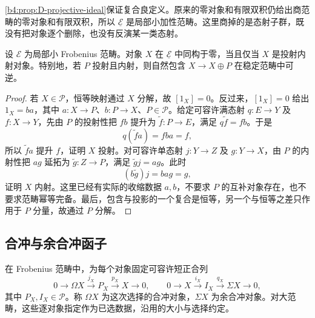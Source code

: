 \cref{b4:prop:D-projective-ideal}保证复合良定义。原来的零对象和有限双积仍给出商范畴的零对象和有限双积，所以 \(\underline{\mathcal E}\) 是局部小加性范畴。这里商掉的是态射子群，既没有把对象逐个删除，也没有反演某一类态射。

\begin{proposition}\label{b4:prop:D-stable-zero}
	设 \(\mathcal E\) 为局部小 Frobenius 范畴。对象 \(X\) 在 \(\underline{\mathcal E}\) 中同构于零，当且仅当 \(X\) 是投射内射对象。特别地，若 \(P\) 投射且内射，则自然包含 \(X\to X\oplus P\) 在稳定范畴中可逆。
\end{proposition}
\begin{proof}
	若 \(X\in\mathcal P\)，恒等映射通过 \(X\) 分解，故 \([1_X]=0\)。反过来，\([1_X]=0\) 给出 \(1_X=ba\)，其中 \(a:X\to P\)、\(b:P\to X\)、\(P\in\mathcal P\)。给定可容许满态射 \(q:E\to Y\) 及 \(f:X\to Y\)，先由 \(P\) 的投射性把 \(fb\) 提升为 \(\widetilde f:P\to E\)，满足 \(q\widetilde f=fb\)。于是
	\[
		q(\widetilde f a)=fba=f,
	\]
	所以 \(\widetilde f a\) 提升 \(f\)，证明 \(X\) 投射。对可容许单态射 \(j:Y\to Z\) 及 \(g:Y\to X\)，由 \(P\) 的内射性把 \(ag\) 延拓为 \(\widetilde g:Z\to P\)，满足 \(\widetilde g j=ag\)。此时
	\[
		(b\widetilde g)j=bag=g,
	\]
	证明 \(X\) 内射。这里已经有实际的收缩数据 \(a,b\)，不要求 \(P\) 的互补对象存在，也不要求范畴幂等完备。最后，包含与投影的一个复合是恒等，另一个与恒等之差只作用于 \(P\) 分量，故通过 \(P\) 分解。
\end{proof}

\subsection{合冲与余合冲函子}
\label{b4:subsec:D01:03}

在 Frobenius 范畴中，为每个对象固定可容许短正合列
\begin{equation}\label{b4:eq:D-syzygy-sequences}
	0\longrightarrow\Omega X\xrightarrow{j_X}P_X\xrightarrow{p_X}X\longrightarrow0, \qquad 0\longrightarrow X\xrightarrow{i_X}I_X\xrightarrow{q_X}\Sigma X\longrightarrow0,
\end{equation}
其中 \(P_X,I_X\in\mathcal P\)。称 \(\Omega X\) 为这次选择的合冲对象，\(\Sigma X\) 为余合冲对象。对大范畴，这些逐对象指定作为已选数据，沿用的大小与选择约定。

